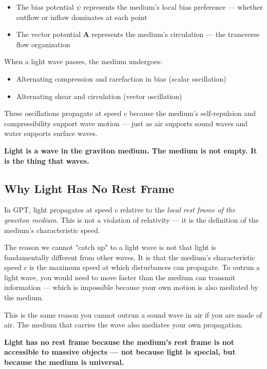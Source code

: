 \documentclass[12pt, a4paper]{article}
\begin{document}
\begin{itemize}
    \item The bias potential \( \psi \) represents the medium's local bias preference — whether outflow or inflow dominates at each point
    \item The vector potential \( \mathbf{A} \) represents the medium's circulation — the transverse flow organization
\end{itemize}

When a light wave passes, the medium undergoes:
\begin{itemize}
    \item Alternating compression and rarefaction in bias (scalar oscillation)
    \item Alternating shear and circulation (vector oscillation)
\end{itemize}

These oscillations propagate at speed \( c \) because the medium's self-repulsion and compressibility support wave motion — just as air supports sound waves and water supports surface waves.

\textbf{Light is a wave in the graviton medium. The medium is not empty. It is the thing that waves.}

\subsection{Why Light Has No Rest Frame}
\label{subsec:light_no_rest_frame}

In GPT, light propagates at speed \( c \) relative to the \textit{local rest frame of the graviton medium}. This is not a violation of relativity — it is the definition of the medium's characteristic speed.

The reason we cannot "catch up" to a light wave is not that light is fundamentally different from other waves. It is that the medium's characteristic speed \( c \) is the maximum speed at which disturbances can propagate. To outrun a light wave, you would need to move faster than the medium can transmit information — which is impossible because your own motion is also mediated by the medium.

This is the same reason you cannot outrun a sound wave in air if you are made of air. The medium that carries the wave also mediates your own propagation.

\textbf{Light has no rest frame because the medium's rest frame is not accessible to massive objects — not because light is special, but because the medium is universal.}
\end{document}
